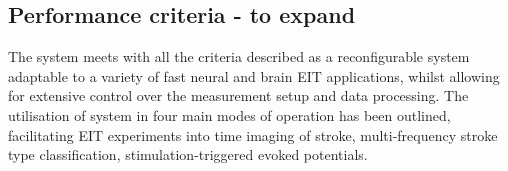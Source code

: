 \subsection{Performance criteria - to expand}
The system meets with all the criteria described as a reconfigurable system adaptable to a variety of fast neural and brain EIT applications, whilst allowing for extensive control over the measurement setup and data processing. The utilisation of system in four main modes of operation has been outlined, facilitating EIT experiments into time imaging of stroke, multi-frequency stroke type classification, stimulation-triggered evoked potentials. 